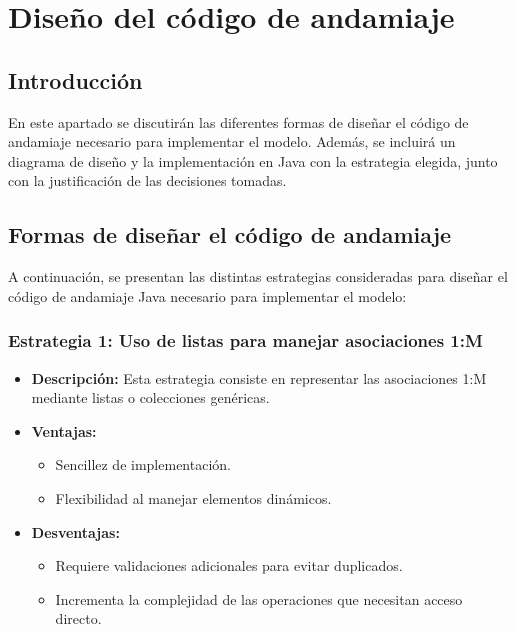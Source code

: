 \section{Diseño del código de andamiaje}

\subsection{Introducción}
En este apartado se discutirán las diferentes formas de diseñar el código de andamiaje necesario para implementar el modelo. Además, se incluirá un diagrama de diseño y la implementación en Java con la estrategia elegida, junto con la justificación de las decisiones tomadas.

\subsection{Formas de diseñar el código de andamiaje}
A continuación, se presentan las distintas estrategias consideradas para diseñar el código de andamiaje Java necesario para implementar el modelo:

\subsubsection{Estrategia 1: Uso de listas para manejar asociaciones 1:M}
\begin{itemize}
    \item \textbf{Descripción:} Esta estrategia consiste en representar las asociaciones 1:M mediante listas o colecciones genéricas.
    \item \textbf{Ventajas:}
    \begin{itemize}
        \item Sencillez de implementación.
        \item Flexibilidad al manejar elementos dinámicos.
    \end{itemize}
    \item \textbf{Desventajas:}
    \begin{itemize}
        \item Requiere validaciones adicionales para evitar duplicados.
        \item Incrementa la complejidad de las operaciones que necesitan acceso directo.
    \end{itemize}
\end{itemize}

